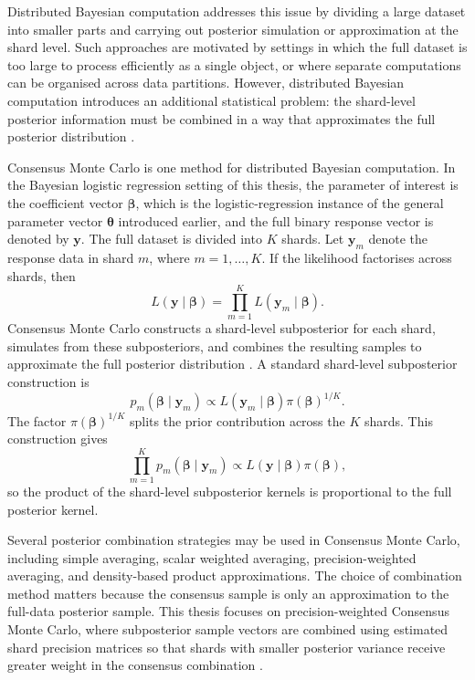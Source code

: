 Distributed Bayesian computation addresses this issue by dividing a large dataset into smaller parts and carrying out posterior simulation or approximation at the shard level. Such approaches are motivated by settings in which the full dataset is too large to process efficiently as a single object, or where separate computations can be organised across data partitions. However, distributed Bayesian computation introduces an additional statistical problem: the shard-level posterior information must be combined in a way that approximates the full posterior distribution \cite{scott2016bayes,scott2017comparing}.

Consensus Monte Carlo is one method for distributed Bayesian computation. In the Bayesian logistic regression setting of this thesis, the parameter of interest is the coefficient vector $\boldsymbol{\beta}$, which is the logistic-regression instance of the general parameter vector $\boldsymbol{\theta}$ introduced earlier, and the full binary response vector is denoted by $\mathbf{y}$. The full dataset is divided into $K$ shards. Let $\mathbf{y}_m$ denote the response data in shard $m$, where $m=1,\ldots,K$. If the likelihood factorises across shards, then
\[
L(\mathbf{y}\mid \boldsymbol{\beta})
=
\prod_{m=1}^{K}
L(\mathbf{y}_m\mid \boldsymbol{\beta}).
\]
Consensus Monte Carlo constructs a shard-level subposterior for each shard, simulates from these subposteriors, and combines the resulting samples to approximate the full posterior distribution \cite{scott2016bayes,scott2017comparing}. A standard shard-level subposterior construction is
\[
p_m(\boldsymbol{\beta}\mid \mathbf{y}_m)
\propto
L(\mathbf{y}_m\mid \boldsymbol{\beta})\pi(\boldsymbol{\beta})^{1/K}.
\]
The factor $\pi(\boldsymbol{\beta})^{1/K}$ splits the prior contribution across the $K$ shards. This construction gives
\[
\prod_{m=1}^{K}
p_m(\boldsymbol{\beta}\mid \mathbf{y}_m)
\propto
L(\mathbf{y}\mid \boldsymbol{\beta})\pi(\boldsymbol{\beta}),
\]
so the product of the shard-level subposterior kernels is proportional to the full posterior kernel.

Several posterior combination strategies may be used in Consensus Monte Carlo, including simple averaging, scalar weighted averaging, precision-weighted averaging, and density-based product approximations. The choice of combination method matters because the consensus sample is only an approximation to the full-data posterior sample. This thesis focuses on precision-weighted Consensus Monte Carlo, where subposterior sample vectors are combined using estimated shard precision matrices so that shards with smaller posterior variance receive greater weight in the consensus combination \cite{scott2017comparing}.

